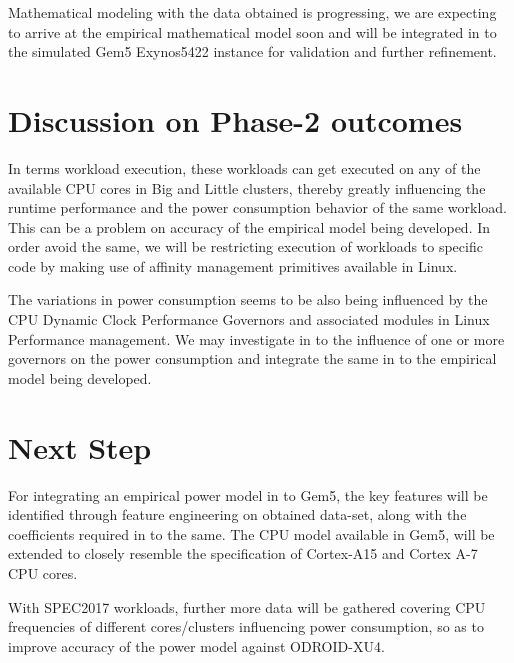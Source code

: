 \documentclass[conference]{IEEEtran}
\begin{document}
    \par Mathematical modeling with the data obtained is progressing, we are expecting to arrive at the empirical mathematical model soon and will be integrated in to the simulated Gem5 Exynos5422 instance for validation and further refinement.

\section{ Discussion on Phase-2 outcomes}
    \par In terms workload execution, these workloads can get executed on any of the available CPU cores in Big and Little clusters, thereby greatly influencing the runtime performance and the power consumption behavior of the same workload. This can be a problem on accuracy of the empirical model being developed. In order avoid the same, we will be restricting execution of workloads to specific code by making use of affinity management primitives available in Linux.

    \par The variations in power consumption seems to be also being influenced by the CPU Dynamic Clock Performance Governors \cite{10.1145/3167132.3167198} and associated modules in Linux Performance management. We may investigate in to the influence of one or more governors on the power consumption and integrate the same in to the empirical model being developed.

\section{Next Step}
    \par For integrating an empirical power model in to Gem5, the key features will be identified through feature engineering on obtained data-set, along with the coefficients required in to the same. The CPU model available in Gem5, will be extended to closely resemble the specification of Cortex-A15 and Cortex A-7 CPU cores.

    \par With SPEC2017 workloads, further more data will be gathered covering CPU frequencies of different cores/clusters influencing power consumption, so as to improve accuracy of the power model against ODROID-XU4.




\end{document}
